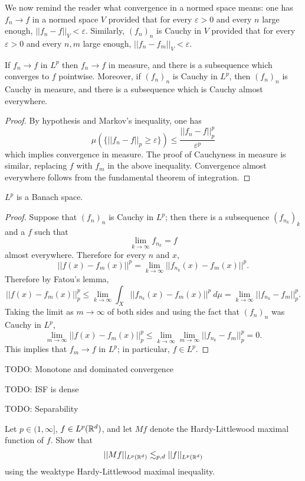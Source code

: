 We now remind the reader what convergence in a normed space means: one has $f_{n} \to f$ in a normed space $V$ provided that for every $\varepsilon > 0$ and every $n$ large enough, $||f_{n} - f||_{V} < \varepsilon$.
Similarly, $(f_{n})_{n}$ is Cauchy in $V$ provided that for every $\varepsilon > 0$ and every $n, m$ large enough, $||f_{n} - f_{m}||_{V} < \varepsilon$.

\begin{corollary}
If $f_{n} \to f$ in $L^p$ then $f_{n} \to f$ in measure, and there is a subsequence which converges to $f$ pointwise.
Moreover, if $(f_{n})_{n}$ is Cauchy in $L^p$, then $(f_{n})_{n}$ is Cauchy in measure, and there is a subsequence which is Cauchy almost everywhere.
\end{corollary}
\begin{proof}
By hypothesis and Markov's inequality, one has
\[\mu(\{||f_{n} - f||_{p}  \geq \varepsilon\}) \leq \frac{||f_{n} - f||^p_{p} }{\varepsilon^p}\]
which implies convergence in measure.
The proof of Cauchyness in measure is similar, replacing $f$ with $f_{m}$ in the above inequality.
Convergence almost everywhere follows from the fundamental theorem of integration.
\end{proof}

\begin{theorem}
$L^p$ is a Banach space.
\end{theorem}
\begin{proof}
Suppose that $(f_{n})_{n}$ is Cauchy in $L^p$; then there is a subsequence $(f_{n_{k}})_{k}$ and a $f$ such that
\[\lim_{k \to \infty} f_{n_{k}} = f\]
almost everywhere. Therefore for every $n$ and $x$,
\[||f(x) - f_{m}(x)||^{p} = \lim_{k \to \infty} ||f_{n_{k}}(x) - f_{m}(x)||^p.\]
Therefore by Fatou's lemma,
\[||f(x) - f_{m}(x)||_{p} ^{p} \leq \lim_{k \to \infty} \int_{X} ||f_{n_{k}}(x) - f_{m}(x)||^p~d\mu = \lim_{k \to \infty} ||f_{n_{k}} - f_{m}||_{p} ^p.\]
Taking the limit as $m \to \infty$ of both sides and using the fact that $(f_{n})_{n}$ was Cauchy in $L^p$,
\[\lim_{m \to \infty} ||f(x) - f_{m}(x)||_{p} ^{p} \leq \lim_{k \to \infty} \lim_{m \to \infty} ||f_{n_{k}} - f_{m}||_{p} ^{p} = 0.\]
This implies that $f_{m} \to f$ in $L^p$; in particular, $f \in L^p$.
\end{proof}

TODO: Monotone and dominated convergence

TODO: ISF is dense

TODO: Separability

\begin{exercise}
Let $p \in (1, \infty]$, $f \in L^p(\mathbb{R}^d)$, and let $Mf$ denote the Hardy-Littlewood maximal function of $f$.
Show that
\[||Mf||_{L^p(\mathbb{R}^d)} \lesssim_{p,d} ||f||_{L^p(\mathbb{R}^d)}\]
using the weaktype Hardy-Littlewood maximal inequality.
\end{exercise}

